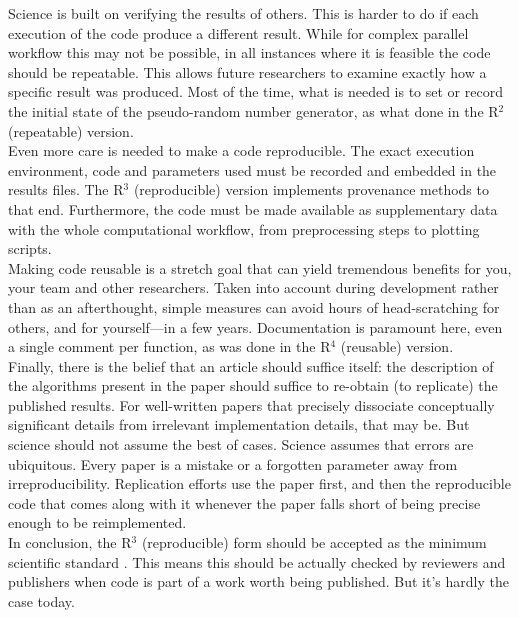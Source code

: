\documentclass[a4paper,11pt]{article}
\begin{document}
Science is built on verifying the results of others. This is harder to do if each execution of the code produce a different result. While for complex parallel workflow this may not be possible, in all instances where it is feasible the code should be repeatable. This allows future researchers to examine exactly how a specific result was produced. Most of the time, what is needed is to set or record the initial state of the pseudo-random number generator, as what done in the R$^2$ (repeatable) version.\\

Even more care is needed to make a code reproducible. The exact execution environment, code and parameters used must be recorded and embedded in the results files. The R$^3$ (reproducible) version implements provenance methods to that end. Furthermore, the code must be made available as supplementary data with the whole computational workflow, from preprocessing steps to plotting scripts.\\

Making code reusable is a stretch goal that can yield tremendous benefits for you, your team and other researchers. Taken into account during development rather than as an afterthought, simple measures can avoid hours of head-scratching for others, and for yourself—in a few years. Documentation is paramount here, even a single comment per function, as was done in the R$^4$ (reusable) version.\\

Finally, there is the belief that an article should suffice itself: the description of the algorithms present in the paper should suffice to re-obtain (to replicate) the published results. For well-written papers that precisely dissociate conceptually significant details from irrelevant implementation details, that may be. But science should not assume the best of cases. Science assumes that errors are ubiquitous. Every paper is a mistake or a forgotten parameter away from irreproducibility. Replication efforts use the paper first, and then the reproducible code that comes along with it whenever the paper falls short of being precise enough to be reimplemented.\\

In conclusion, the R$^3$ (reproducible) form should be accepted as the minimum
scientific standard \citep{Wilson:2017}. This means this should be actually
checked by reviewers and publishers when code is part of a work worth being
published. But it's hardly the case today.\\
\end{document}
